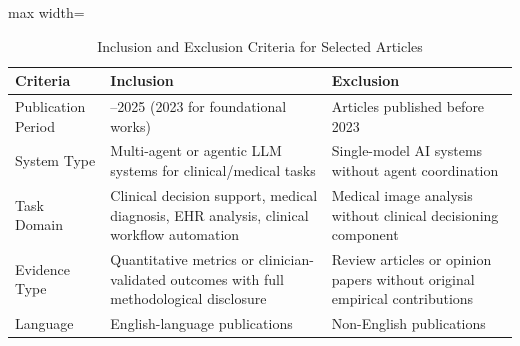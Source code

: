 \begin{table}[!htbp]
\centering
\caption{Inclusion and Exclusion Criteria for Selected Articles}
\label{tab:inclusion}
\begin{adjustbox}{max width=\textwidth}
\begin{tabular}{>{\raggedright\arraybackslash}p{3.0cm} >{\raggedright\arraybackslash}p{5.5cm} >{\raggedright\arraybackslash}p{5.5cm}}
\toprule
\textbf{Criteria} & \textbf{Inclusion} & \textbf{Exclusion} \\
\midrule
Publication Period
  & 2024--2025 (2023 for foundational works)
  & Articles published before 2023 \\[4pt]
System Type
  & Multi-agent or agentic LLM systems for clinical/medical tasks
  & Single-model AI systems without agent coordination \\[4pt]
Task Domain
  & Clinical decision support, medical diagnosis, EHR analysis, clinical workflow automation
  & Medical image analysis without clinical decisioning component \\[4pt]
Evidence Type
  & Quantitative metrics or clinician-validated outcomes with full methodological disclosure
  & Review articles or opinion papers without original empirical contributions \\[4pt]
Language
  & English-language publications
  & Non-English publications \\
\bottomrule
\end{tabular}
\end{adjustbox}
\end{table}

